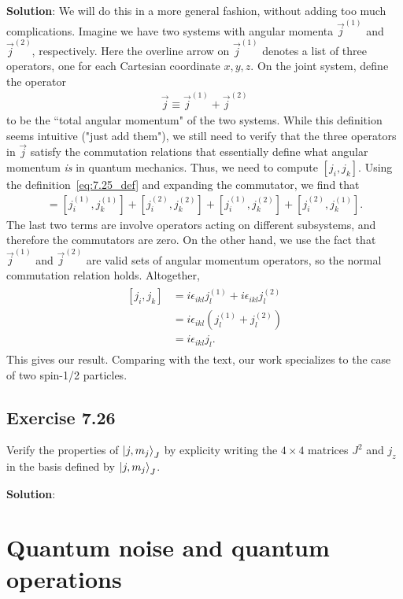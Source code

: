 \documentclass{book}
\begin{document}
    \textbf{Solution}: We will do this in a more general fashion, without adding too much complications. Imagine we have two systems with angular momenta $\vec{j}^{(1)}$ and $\vec{j}^{(2)}$, respectively. Here the overline arrow on $\vec{j}^{(1)}$ denotes a list of three operators, one for each Cartesian coordinate $x,y,z$. On the joint system, define the operator
    \begin{align} \label{eq:7.25_def}
        \vec{j} \equiv \vec{j}^{(1)} + \vec{j}^{(2)}
    \end{align}
    to be the ``total angular momentum" of the two systems. While this definition seems intuitive ("just add them"), we still need to verify that the three operators in $\vec{j}$ satisfy the commutation relations that essentially define what angular momentum \emph{is} in quantum mechanics. Thus, we need to compute $[j_i, j_k]$. Using the definition~\eqref{eq:7.25_def} and expanding the commutator, we find that
    \begin{align}
        [j_i, j_k] = [j_i^{(1)}, j_k^{(1)}] + [j_i^{(2)}, j_k^{(2)}] + [j_i^{(1)}, j_k^{(2)}] + [j_i^{(2)}, j_k^{(1)}].
    \end{align}
    The last two terms are involve operators acting on different subsystems, and therefore the commutators are zero. On the other hand, we use the fact that $\vec{j}^{(1)}$ and $\vec{j}^{(2)}$ are valid sets of angular momentum operators, so the normal commutation relation holds. Altogether,
    \begin{align}
    \begin{aligned}
        [j_i, j_k] &= i\epsilon_{ikl} j_l^{(1)} + i\epsilon_{ikl} j_l^{(2)} \\
        &= i \epsilon_{ikl}(j_l^{(1)} + j_l^{(2)}) \\
        &= i \epsilon_{ikl}j_l.
    \end{aligned}
    \end{align}
    This gives our result. Comparing with the text, our work specializes to the case of two spin-1/2 particles. 

\section*{Exercise 7.26}
    Verify the properties of $\ket{j, m_j}_J$ by explicity writing the $4\times 4$ matrices $J^2$ and $j_z$ in the basis defined by $\ket{j,m_j}_J$.

    \textbf{Solution}:
    
\chapter{Quantum noise and quantum operations}
\end{document}
